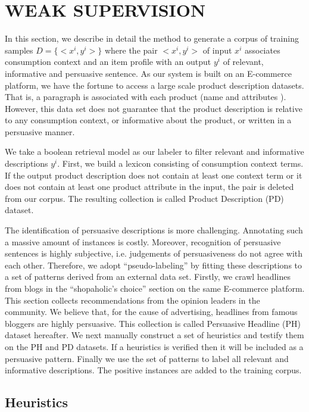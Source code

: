 \documentclass[sigconf]{acmart}
\begin{document}
\section{WEAK SUPERVISION}\label{sec:weak}

In this section, we describe in detail the method to generate a corpus of training samples $D=\{<x^i,y^i>\}$ where the pair $<x^i,y^i>$ of input $x^i$ associates consumption context and an item profile with an output $y^i$ of relevant, informative and persuasive sentence. As our system is built on an E-commerce platform, we have the fortune to access a large scale product description datasets. That is, a paragraph is associated with each product (name and attributes ). However, this data set does not guarantee that the product description is relative to any consumption context, or informative about the product, or written in a persuasive manner. 

We take a boolean retrieval model as our labeler to filter relevant and informative descriptions $y^i$. First, we build a lexicon consisting of consumption context terms. If the output product description does not contain at least one context term or it does not contain at least one product attribute in the input, the pair is deleted from our corpus. The resulting collection is called Product Description (PD) dataset.
 
The identification of persuasive descriptions is more challenging. 
Annotating such a massive amount of instances is costly. Moreover, recognition of persuasive sentences is highly subjective, i.e. judgements of persuasiveness do not agree with each other.
Therefore, we adopt ``pseudo-labeling'' by fitting these descriptions to a set of patterns derived from an external data set.
Firstly, we crawl headlines from blogs in the ``shopaholic's choice'' section on the same E-commerce platform.
This section collects recommendations from the opinion leaders in the community.
We believe that, for the cause of advertising, headlines from famous bloggers are highly persuasive.  
This collection is called Persuasive Headline (PH) dataset hereafter.
We next manually construct a set of heuristics and testify them on the PH and PD datasets.
If a heuristics is verified then it will be included as a persuasive pattern.
Finally we use the set of patterns to label all relevant and informative descriptions.
The positive instances are added to the training corpus.

\subsection{Heuristics}
\end{document}
